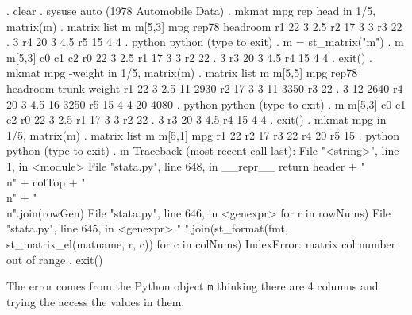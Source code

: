 \documentclass{article}
\begin{document}
\begin{stlog}
. clear
{\smallskip}
. sysuse auto
(1978 Automobile Data)
{\smallskip}
. mkmat mpg rep head in 1/5, matrix(m)
{\smallskip}
. matrix list m
{\smallskip}
m[5,3]
         mpg     rep78  headroom
r1        22         3       2.5
r2        17         3         3
r3        22         .         3
r4        20         3       4.5
r5        15         4         4
{\smallskip}
. python
 python (type {} to exit) 
. m = st_matrix("m")
{\smallskip}
. m
{\smallskip}
m[5,3]
           c0         c1         c2
r0         22          3        2.5
r1         17          3          3
r2         22          .          3
r3         20          3        4.5
r4         15          4          4
{\smallskip}
. exit()
{\smallskip}
. mkmat mpg -weight in 1/5, matrix(m)
{\smallskip}
. matrix list m
{\smallskip}
m[5,5]
         mpg     rep78  headroom     trunk    weight
r1        22         3       2.5        11      2930
r2        17         3         3        11      3350
r3        22         .         3        12      2640
r4        20         3       4.5        16      3250
r5        15         4         4        20      4080
{\smallskip}
. python
 python (type {} to exit) 
. m
{\smallskip}
m[5,3]
           c0         c1         c2
r0         22          3        2.5
r1         17          3          3
r2         22          .          3
r3         20          3        4.5
r4         15          4          4
{\smallskip}
. exit()
{\smallskip}
. mkmat mpg in 1/5, matrix(m)
{\smallskip}
. matrix list m
{\smallskip}
m[5,1]
    mpg
r1   22
r2   17
r3   22
r4   20
r5   15
{\smallskip}
. python
 python (type {} to exit) 
. m
{\color{red}Traceback (most recent call last):
  File "<string>", line 1, in <module>
  File "stata.py", line 648, in __repr__
    return header + "\\n" + colTop + "\\n" + "\\n".join(rowGen)
  File "stata.py", line 646, in <genexpr>
    for r in rowNums)
  File "stata.py", line 645, in <genexpr>
    " ".join(st_format(fmt, st_matrix_el(matname, r, c)) for c in colNums)
IndexError: matrix col number out of range}
{\smallskip}
. exit()
\end{stlog}

\medskip

The error comes from the Python object \texttt{m} thinking there are 4 columns and trying the access the values in them.
\end{document}

